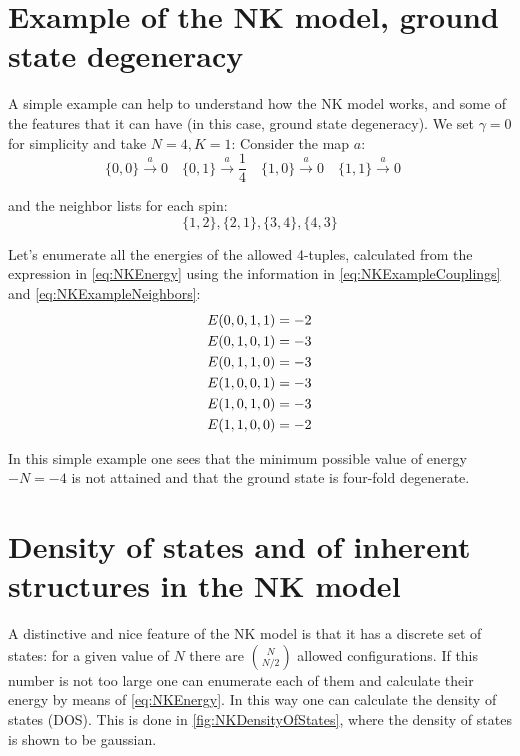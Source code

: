 \section*{Example of the NK model, ground state degeneracy}

A simple example can help to understand how the NK model works, and some of the features that it can have (in this case, ground state degeneracy). We set $\gamma=0$ for simplicity and take $N = 4, K = 1$:
Consider the map $a$:
\begin{equation}
	\{0, 0\} \xrightarrow{a} 0 \quad 
	\{0, 1\} \xrightarrow{a} \frac{1}{4} \quad
	\{1, 0\} \xrightarrow{a} 0 \quad
	\{1, 1\} \xrightarrow{a} 0 \quad{}
	\label{eq:NKExampleCouplings}
\end{equation}

and the neighbor lists for each spin:
\begin{equation}
	\{1, 2\}, \{2, 1\}, \{3, 4\}, \{4, 3\}
	\label{eq:NKExampleNeighbors}
\end{equation}

Let's enumerate all the energies of the allowed 4-tuples, calculated from the expression in \autoref{eq:NKEnergy} using the information in \autoref{eq:NKExampleCouplings} and \autoref{eq:NKExampleNeighbors}: 
\begin{align}
	E (0, 0, 1, 1) = -2 \notag \\
	E (0, 1, 0, 1) = -3 \notag \\
	E (0, 1, 1, 0) = -3 \notag \\
	E (1, 0, 0, 1) = -3 \notag \\
	E (1, 0, 1, 0) = -3 \notag \\
	E (1, 1, 0, 0) = -2 
\end{align}

In this simple example one sees that the minimum possible value of energy $-N = -4$ is not attained and that the ground state is four-fold degenerate.

\section*{Density of states and of inherent structures in the NK model}

A distinctive and nice feature of the NK model is that it has a discrete set of states: for a given value of $N$ there are $\binom{N}{N/2}$ allowed configurations. If this number is not too large one can enumerate each of them and calculate their energy by means of \autoref{eq:NKEnergy}. In this way one can calculate the density of states (DOS). This is done in \autoref{fig:NKDensityOfStates}, where the density of states is shown to be gaussian. 

